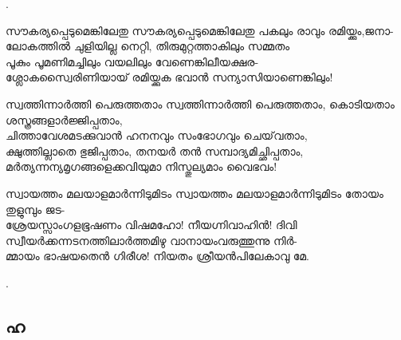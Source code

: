 \begin{enumerate}
. 

\begin{slokam}{\VSv}{\VKG}{സൗകര്യപ്പെടുമെങ്കിലേതു}
സൗകര്യപ്പെടുമെങ്കിലേതു പകലും രാവും രമിയ്ക്കും,ജനാ-\\
ലോകത്തിൽ ചുളിയില്ല നെറ്റി, തിരുമുറ്റത്താകിലും സമ്മതം\\
പൂകും പൂമണിമച്ചിലും വയലിലും വേണെങ്കിലീയക്ഷര-\\
ശ്ലോകസ്വൈരിണിയായ്‌ രമിയ്ക്കുക ഭവാൻ സന്യാസിയാണെങ്കിലും!
\end{slokam}



\begin{slokam}{\VSv}{\Balendu}{സ്വത്തിന്നാര്‍ത്തി പെരുത്തതാം}
സ്വത്തിന്നാര്‍ത്തി പെരുത്തതാം, കൊടിയതാം ശസ്ത്രങ്ങളാര്‍ജ്ജിപ്പതാം,\\
ചിത്താവേശമടക്കുവാന്‍ ഹനനവും സംഭോഗവും ചെയ്‌വതാം,\\
ക്ഷുത്തില്ലാതെ ഭുജിപ്പതാം, തനയര്‍ തന്‍ സമ്പാദ്യമിച്ഛിപ്പതാം,\\
മര്‍ത്യന്നന്യമൃഗങ്ങളെക്കവിയുമാ നിസ്തുല്യമാം വൈഭവം!
\end{slokam}




\begin{slokam}{\VSv}{\KJ}{സ്വായത്തം  മലയാളമാർന്നിടുമിടം}
സ്വായത്തം മലയാളമാർന്നിടുമിടം തോയം തുളുമ്പും ജട-\\
ശ്രേയസ്സാംഗളഭൂഷണം വിഷമഹോ! നീയഗ്നിവാഹിൻ! ദിവി\\
സ്വീയർക്കന്നടനത്തിലാർത്തമിഴു വാനായംവരുത്തുന്നു നിർ-\\
മ്മായം ഭാഷയതെൻ ഗിരീശ! നിയതം ശ്രീയൻപിലേകാവു മേ.
\end{slokam}


.

\end{enumerate}

\subsection{ഹ}

